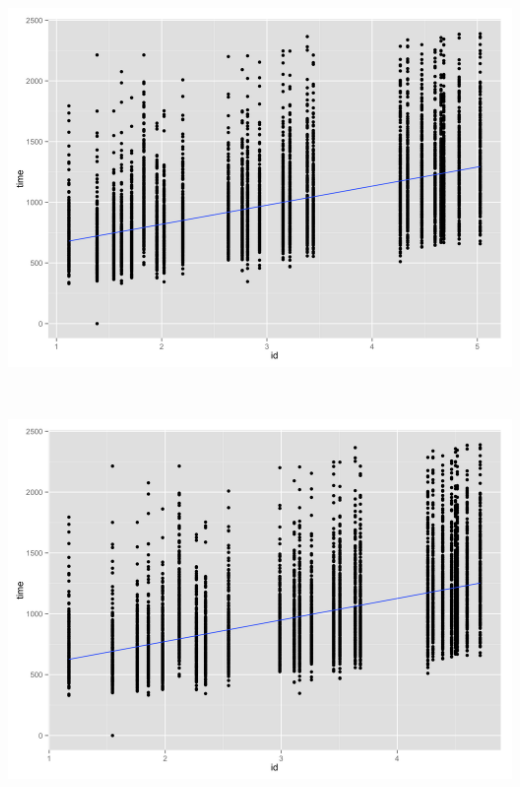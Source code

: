 \begin{minipage}{\linewidth}
	\begin{minipage}[b]{0.45\linewidth}
		\includegraphics[width=\textwidth]{images/plots/plot_model_meyer}
		\label{fig:meyer_affine_line}
	\end{minipage}
	\begin{minipage}[b]{0.1\linewidth}
	~
	\end{minipage}
	\begin{minipage}[b]{0.45\linewidth}
		\includegraphics[width=\textwidth]{images/plots/plot_model_mackenzie}
		\label{fig:mackenzie_affine_line}
	\end{minipage}
\end{minipage}

